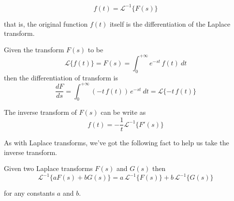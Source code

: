\begin{equation}
    f(t) = \mathcal{L}^{-1} \{F(s)\}
\end{equation}

that is, the original function $f(t)$ itself is the differentiation of the Laplace transform.

\begin{theorem}
    Given the transform $F(s)$ to be
    \begin{equation}
        \mathcal{L}\{f(t)\} = F(s) = \int_{0}^{+\infty} e^{-st}\,f(t)\> dt 
    \end{equation}
    then the differentiation of transform is 
    \begin{equation}
        \frac{dF}{ds} = \int_{0}^{+\infty} (-t\,f(t))\, e^{-st} \>dt = \mathcal{L} \{-t\, f(t)\}
    \end{equation}
\end{theorem}

\begin{corollary}
    The inverse transform of $F(s)$ can be write as
    \begin{equation}
        f(t) = - \frac{1}{t} \mathcal{L}^{-1} \{F'(s)\}
    \end{equation}
\end{corollary}

As with Laplace transforms, we've got the following fact to help us take the inverse transform.

\begin{theorem}
    Given two Laplace transforms $F(s)$ and $G(s)$ then
    \begin{equation}
        \mathcal{L}^{-1} \{aF(s) + bG(s)\} = a\,\mathcal{L}^{-1} \{F(s)\} + b\, \mathcal{L}^{-1} \{G(s)\}
    \end{equation}

    for any constants $a$ and $b$.
\end{theorem}

